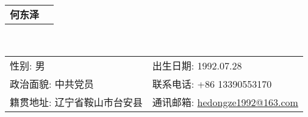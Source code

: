 \newcommand{\myheader}{
\begin{tabular*}{\textwidth}{c@{\extracolsep{\fill}}l}
  \centering\textbf{\LARGE 何东泽} &  
\end{tabular*}\\ \vspace{0.1in}

\begin{tabular*}{\textwidth}{l@{\extracolsep{\fill}}l}
  {\color{labelgrey}性别}: 男 & {\color{labelgrey}出生日期}: 1992.07.28 \\
  {\color{labelgrey}政治面貌}: 中共党员 &  {\color{labelgrey}联系电话}: +86 13390553170\\
  {\color{labelgrey}籍贯地址}: 辽宁省鞍山市台安县 &  {\color{labelgrey}通讯邮箱}: \href{mailto:hedongze1992@163.com}{hedongze1992@163.com}\\
\end{tabular*}\\\vspace{0.1in}}

\myheader

